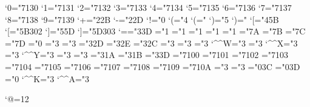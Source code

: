 \mathcode`0="7130
\mathcode`1="7131
\mathcode`2="7132
\mathcode`3="7133
\mathcode`4="7134
\mathcode`5="7135
\mathcode`6="7136
\mathcode`7="7137
\mathcode`8="7138
\mathcode`9="7139
\mathcode`+="2\frfam@2B
\mathcode`-="2\frfam@2D
\mathcode`!="0
\mathcode`(="4 \delcode`(="
\mathcode`)="5 \delcode`)="
\mathcode`[="4\frfam@5B \delcode`[="\frfam@5B302
\mathcode`]="5\frfam@5D \delcode`]="\frfam@5D303
\mathcode`=="3\frfam@3D
\mathchardef\intop="1
\mathchardef\ointop="1
\mathchardef\coprod="1
\mathchardef\prod="1
\mathchardef\sum="1
\mathchardef\braceld="\euexfam@7A \mathchardef\bracerd="\euexfam@7B
\mathchardef\bracelu="\euexfam@7C \mathchardef\braceru="\euexfam@7D
\mathchardef\infty="0
\mathchardef\nearrow="3
\mathchardef\searrow="3
\mathchardef\nwarrow="3\euexfam@2D
\mathchardef\swarrow="3\euexfam@2E
\mathchardef\Leftrightarrow="3\euexfam@2C
\mathchardef\Leftarrow="3
\mathchardef\Rightarrow="3
\mathchardef\leftrightarrow="3 \mathcode`\^^W="3
\mathchardef\leftarrow="3 \let\gets=\leftarrow \mathcode`\^^X="3
\mathchardef\rightarrow="3 \let\to=\rightarrow \mathcode`\^^Y="3
\mathchardef\leftharpoonup="3
\mathchardef\leftharpoondown="3
\mathchardef\rightharpoonup="3\euexfam@1A
\mathchardef\rightharpoondown="3\euexfam@1B
\mathchardef\Relbar="3\eqfam@3D %
\mathchardef\Gamma="7100
\mathchardef\Delta="7101
\mathchardef\Theta="7102
\mathchardef\Lambda="7103
\mathchardef\Xi="7104
\mathchardef\Pi="7105
\mathchardef\Sigma="7106
\mathchardef\Upsilon="7107
\mathchardef\Phi="7108
\mathchardef\Psi="7109
\mathchardef\Omega="710A
\mathchardef\leq="3
\mathchardef\geq="3
\mathchardef\Re="0\scrfam@3C
\mathchardef\Im="0\scrfam@3D
\mathchardef\aleph="0
\def\uparrow{\delimiter"3\euexfam@22378 } \mathcode`\^^K="3
\def\downarrow{\delimiter"3\euexfam@23379 } \mathcode`\^^A="3
\def\updownarrow{\delimiter"3\euexfam@6C33F }
\def\Uparrow{\delimiter"3\euexfam@2A37E }
\def\Downarrow{\delimiter"3\euexfam@2B37F }
\def\Updownarrow{\delimiter"3\euexfam@6D377 }
\def\rbrace{\delimiter"5\scrfam@67\euexfam@09 } \let\}=\rbrace
\def\lbrace{\delimiter"4\scrfam@66\euexfam@08 } \let\{=\lbrace
\def\vert{\delimiter"\scrfam@6A30C }
\def\backslash{\delimiter"\scrfam@6E30F }
\let\varsigma=\sigma \let\varrho=\rho %

\rm

\catcode`@=12

\endinput
